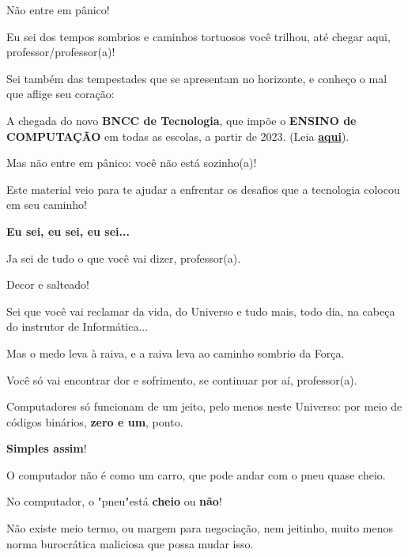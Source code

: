 
\begin{multicols}{2}
\huge Não entre em pânico!

\vfill\null
\pagebreak

\normalsize

Eu sei dos tempos sombrios e caminhos tortuosos você trilhou, até chegar aqui, professor/professor(a)!

Sei também das tempestades que se apresentam no horizonte, e conheço o mal que aflige seu coração:

A chegada do novo \textbf{BNCC de Tecnologia}, que impõe o \textbf{ENSINO de COMPUTAÇÃO} em todas as escolas, a partir de 2023. (Leia \href{http://portal.mec.gov.br/index.php?option=com_docman&view=download&alias=241671-rceb001-22&category_slug=outubro-2022-pdf&Itemid=30192}{\textbf{aqui}}).

\vfill\null
\columnbreak

Mas não entre em pânico: você não está sozinho(a)!

Este material veio para te ajudar a enfrentar os desafios que a tecnologia colocou em seu caminho!

\textbf{Eu sei, eu sei, eu sei...}

Ja sei de tudo o que você vai dizer, professor(a).

Decor e salteado!

Sei que você vai reclamar da vida, do Universo e tudo mais, todo dia, na cabeça do instrutor de Informática... 

Mas o medo leva à raiva, e a raiva leva ao caminho sombrio da Força.

Você só vai encontrar dor e sofrimento, se continuar por aí, professor(a).

Computadores só funcionam de um jeito, pelo menos neste Universo:  por meio de códigos binários, \textbf{zero e um}, ponto.

\textbf{Simples assim}!


O computador não é como um carro, que pode andar com o pneu quase cheio.

No computador, o "pneu"\space está \textbf{cheio} ou \textbf{não}!

Não existe meio termo, ou margem para negociação, nem jeitinho, muito menos norma burocrática maliciosa que possa mudar isso.


\end{multicols}
